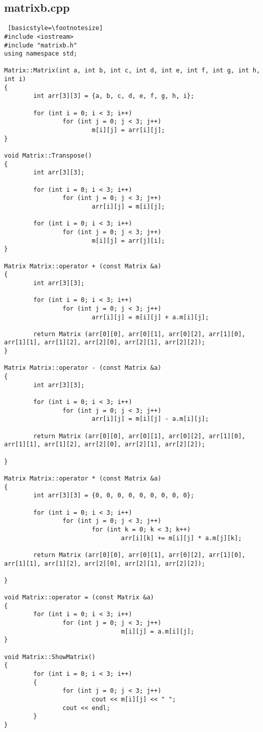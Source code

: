 \documentclass[twoside,twocolumn]{article}
\begin{document}
\subsection{matrixb.cpp}
\begin{lstlisting} [basicstyle=\footnotesize]
#include <iostream>
#include "matrixb.h"
using namespace std;

Matrix::Matrix(int a, int b, int c, int d, int e, int f, int g, int h, int i)
{
        int arr[3][3] = {a, b, c, d, e, f, g, h, i};

        for (int i = 0; i < 3; i++)
                for (int j = 0; j < 3; j++)
                        m[i][j] = arr[i][j];
}

void Matrix::Transpose()
{
        int arr[3][3];

        for (int i = 0; i < 3; i++)
                for (int j = 0; j < 3; j++)
                        arr[i][j] = m[i][j];

        for (int i = 0; i < 3; i++)
                for (int j = 0; j < 3; j++)
                        m[i][j] = arr[j][i];
}

Matrix Matrix::operator + (const Matrix &a)
{
        int arr[3][3];

        for (int i = 0; i < 3; i++)
                for (int j = 0; j < 3; j++)
                        arr[i][j] = m[i][j] + a.m[i][j];

        return Matrix (arr[0][0], arr[0][1], arr[0][2], arr[1][0], arr[1][1], arr[1][2], arr[2][0], arr[2][1], arr[2][2]);
}

Matrix Matrix::operator - (const Matrix &a)
{
        int arr[3][3];

        for (int i = 0; i < 3; i++)
                for (int j = 0; j < 3; j++)
                        arr[i][j] = m[i][j] - a.m[i][j];

        return Matrix (arr[0][0], arr[0][1], arr[0][2], arr[1][0], arr[1][1], arr[1][2], arr[2][0], arr[2][1], arr[2][2]);

}

Matrix Matrix::operator * (const Matrix &a)
{
        int arr[3][3] = {0, 0, 0, 0, 0, 0, 0, 0, 0};

        for (int i = 0; i < 3; i++)
                for (int j = 0; j < 3; j++)
                        for (int k = 0; k < 3; k++)
                                arr[i][k] += m[i][j] * a.m[j][k];

        return Matrix (arr[0][0], arr[0][1], arr[0][2], arr[1][0], arr[1][1], arr[1][2], arr[2][0], arr[2][1], arr[2][2]);

}

void Matrix::operator = (const Matrix &a)
{
        for (int i = 0; i < 3; i++)
                for (int j = 0; j < 3; j++)
                                m[i][j] = a.m[i][j];
}

void Matrix::ShowMatrix()
{
        for (int i = 0; i < 3; i++)
        {
                for (int j = 0; j < 3; j++)
                        cout << m[i][j] << " ";
                cout << endl;
        }
}
\end{lstlisting}
\end{document}

